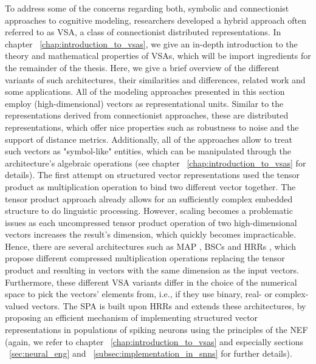 To address some of the concerns regarding both, symbolic and connectionist approaches to cognitive modeling, researchers developed a hybrid approach often referred to as \acf{VSA}, a class of connectionist distributed representations.
In chapter ~\ref{chap:introduction_to_vsas}, we give an in-depth introduction to the theory and mathematical properties of \acp{VSA}, which will be import ingredients for the remainder of the thesis.
Here, we give a brief overview of the different variants of such architectures, their similarities and differences, related work and some applications.
All of the modeling approaches presented in this section employ (high-dimensional) vectors as representational units.
Similar to the representations derived from connectionist approaches, these are distributed representations, which offer nice properties such as robustness to noise and the support of distance metrics.
Additionally, all of the approaches allow to treat such vectors as "symbol-like" entities, which can be manipulated through the architecture's algebraic operations (see chapter ~\ref{chap:introduction_to_vsas} for details).
The first attempt on structured vector representations used the tensor product as multiplication operation \cite{Smolensky1990} to bind two different vector together.
The tensor product approach already allows for an sufficiently complex embedded structure to do linguistic processing.
However, scaling becomes a problematic issues as each uncompressed tensor product operation of two high-dimensional vectors increases the result's dimension, which quickly becomes impracticable.
Hence, there are several architectures such as \ac{MAP} \cite{Gayler1998, Gayler2003}, \acp{BSC} \cite{Kanerva1988} and \acp{HRR} \cite{Plate1991, Plate1994}, which propose different compressed multiplication operations replacing the tensor product and resulting in vectors with the same dimension as the input vectors.
Furthermore, these different \ac{VSA} variants differ in the choice of the numerical space to pick the vectors' elements from, i.e., if they use binary, real- or complex-valued vectors. 
The \ac{SPA} \cite{Eliasmith2013} is built upon \acp{HRR} and extends these architectures, by proposing an efficient mechanism of implementing structured vector representations in populations of spiking neurons using the principles of the \ac{NEF} \cite{Eliasmith2003} (again, we refer to chapter ~\ref{chap:introduction_to_vsas} and especially sections ~\ref{sec:neural_eng} and ~\ref{subsec:implementation_in_snns} for further details).   

